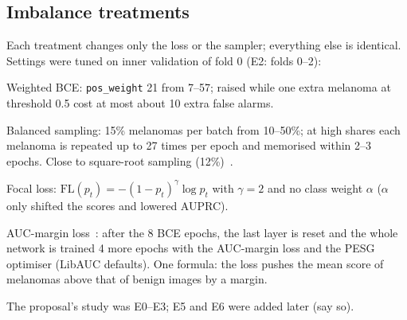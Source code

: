 \subsection{Imbalance treatments}
\begin{notes}
  \item Each treatment changes only the loss or the sampler; everything else is identical. Settings were tuned on inner validation of fold 0 (E2: folds 0--2):
  \item Weighted BCE: \texttt{pos\_weight} 21 from 7--57; raised while one extra melanoma at threshold 0.5 cost at most about 10 extra false alarms.
  \item Balanced sampling: 15\% melanomas per batch from 10--50\%; at high shares each melanoma is repeated up to 27 times per epoch and memorised within 2--3 epochs. Close to square-root sampling (12\%)~\cite{kang2020decoupling}.
  \item Focal loss: $\mathrm{FL}(p_t)=-(1-p_t)^{\gamma}\log p_t$ with $\gamma=2$ and no class weight $\alpha$ ($\alpha$ only shifted the scores and lowered AUPRC).
  \item AUC-margin loss~\cite{yuan2021large}: after the 8 BCE epochs, the last layer is reset and the whole network is trained 4 more epochs with the AUC-margin loss and the PESG optimiser (LibAUC defaults). One formula: the loss pushes the mean score of melanomas above that of benign images by a margin.
  \item The proposal's study was E0--E3; E5 and E6 were added later (say so).
\end{notes}

